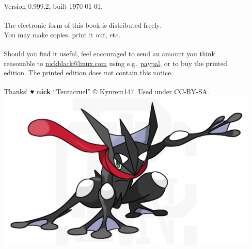 \clearpage
\noindent{}Version 0.999.2, built \today.\\
\\
The electronic form of this book is distributed freely.\\
You may make copies, print it out, etc.\\
\\
Should you find it useful, feel encouraged to send an amount you think reasonable to
  \href{mailto:nickblack@linux.com}{nickblack@linux.com} using
  e.g.\ \href{https://paypal.me/dankamongmen}{paypal},
  or to buy the printed edition.
The printed edition does not contain this notice.\\
\\
Thanks! {\textbf{{\symbolfont♥} nick}}
\vfill
``Tentacruel'' © Kyurem147. Used under CC-BY-SA\@.
\vfill
\includegraphics[width=\linewidth,keepaspectratio]{images/greninja.png}
